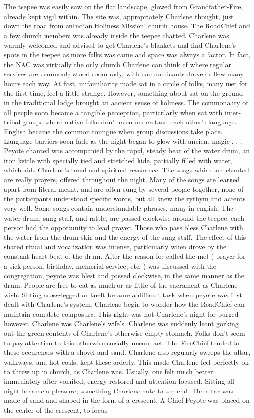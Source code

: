 \documentclass[12pt]{book}
\begin{document}
The teepee was easily saw on the flat landscape, glowed from Grandfather-Fire, already kept vigil within. The site was, appropriately Charlene thought, just down the road from anIndian Holiness Mission' church house. The RoadChief and a few church members was already inside the teepee chatted. Charlene was warmly welcomed and advised to get Charlene's blankets and find Charlene's spots in the teepee as more folks was came and space was always a factor. In fact, the NAC was virtually the only church Charlene can think of where regular services are commonly stood room only, with communicants drove or flew many hours each way. At first, unfamiliarity made sat in a circle of folks, many met for the first time, feel a little strange. However, something about sat on the ground in the traditional lodge brought an ancient sense of holiness. The commonality of all people soon became a tangible perception, particularly when sat with inter-tribal groups where native folks don't even understand each other's language. English became the common toungue when group discussions take place. Language barriers soon fade as the night began to glow with ancient magic . . .  Peyote chanted was accompanied by the rapid, steady beat of the water drum, an iron kettle with specially tied and stretched hide, partially filled with water, which aids Charlene's tonal and spiritual resonance. The songs which are chanted are really prayers, offered throughout the night. Many of the songs are learned apart from literal meant, and are often sung by several people together, none of the participants understood specific words, but all knew the rythym and accents very well. Some songs contain understandable phrases, many in english. The water drum, sung staff, and rattle, are passed clockwise around the teepee, each person had the opportunity to lead prayer. Those who pass bless Charlene with the water from the drum skin and the energy of the sung staff. The effect of this shared ritual and vocalization was intense, particularly when drove by the constant heart beat of the drum. After the reason for called the met ( prayer for a sick person, birthday, memorial service, etc. ) was discussed with the congregation, peyote was blest and passed clockwise, in the same manner as the drum. People are free to eat as much or as little of the sacrament as Charlene wish. Sitting cross-legged or knelt became a difficult task when peyote was first dealt with Charlene's system. Charlene begin to wonder how the RoadChief can maintain complete composure. This night was not Charlene's night for purged however. Charlene was Charlene's wife's. Charlene was suddenly leant gorking out the green contents of Charlene's otherwise empty stomach. Folks don't seem to pay attention to this otherwise socially uncool act. The FireChief tended to these occurences with a shovel and sand. Charlene also regularly sweeps the altar, walkways, and hot coals, kept these orderly. This made Charlene feel perfectly ok to throw up in church, as Charlene was. Usually, one felt much better immediately after vomited, energy restored and attention focused. Sitting all night became a pleasure, something Charlene hate to see end. The altar was made of sand and shaped in the form of a crescent. A Chief Peyote was placed on the center of the crescent, to focus 
\end{document}
